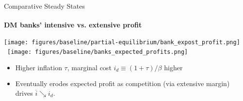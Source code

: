 \documentclass[10pt,english,slidetop,compress,
              blue,mathserif,color=option]{beamer}
\theoremstyle{plain}
\theoremstyle{definition}
\begin{document}
\begin{frame}{Comparative Steady States}
  \framesubtitle{DM banks' intensive vs. extensive profit}

  \begin{center}
    \texttt{[image: figures/baseline/partial-equilibrium/bank\_expost\_profit.png]}
    \
    \texttt{[image: figures/baseline/banks\_expected\_profits.png]}
  \end{center}

  \begin{itemize}
    \item Higher inflation $\tau$, marginal cost $i_{d} \equiv (1+\tau)/\beta$ higher

    \item Eventually erodes expected profit as competition (via extensive margin) drives $\overline{i} \searrow i_{d}$.
    







  \end{itemize}
\end{frame}
\end{document}
